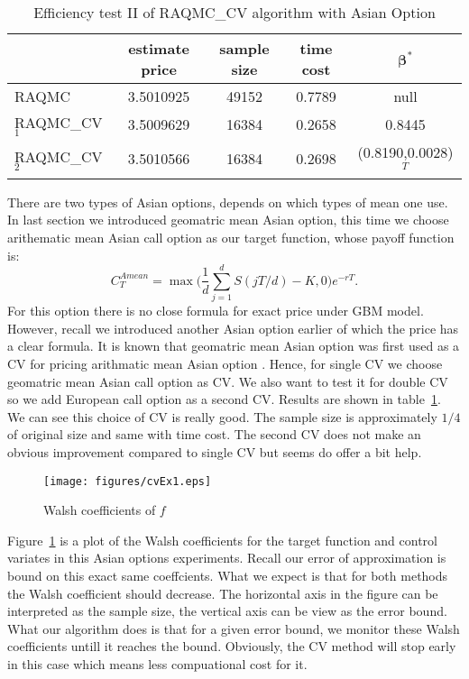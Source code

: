 \begin{table}[h]
    \centering
	\caption{Efficiency test II of RAQMC\_CV algorithm with Asian Option}
    \label{tb:efftest2a}
    \begin{tabular}{lcccc}  
    \hline\hline
    &estimate price&sample size&time cost&$\boldsymbol{\beta}^*$\\[0.5ex]
    \hline
    RAQMC& 3.5010925& 49152 & 0.7789 & null\\[1ex]
    RAQMC\_CV$_1$&3.5009629& 16384 & 0.2658& 0.8445 \\[1ex]
    RAQMC\_CV$_2$&3.5010566& 16384 & 0.2698&(0.8190,0.0028)$^T$\\[1ex]
    \hline
	\end{tabular}
\end{table}
There are two types of Asian options, depends on which types of mean one use. 
In last section we introduced geomatric mean Asian option, this time we choose arithematic mean Asian call option as our target function, whose payoff function is:
\[ C_{T}^{Amean} = \max\Big(\frac{1}{d}\sum_{j=1}^{d}S(jT/d)-K, 0\Big)e^{-rT}.\]
For this option there is no close formula for exact price under GBM model.
However, recall we introduced another Asian option earlier of which the price has a clear formula. 
It is known that geomatric mean Asian option was first used as a CV for pricing arithmatic mean Asian option \cite{kemna1990pricing}. 
Hence, for single CV we choose geomatric mean Asian call option as CV. 
We also want to test it for double CV so we add European call option as a second CV. 
Results are shown in table~\ref{tb:efftest2a}. We can see this choice of CV is really good. 
The sample size is approximately $1/4$ of original size and same with time cost. 
The second CV does not make an obvious improvement compared to single CV but seems do offer a bit help.    

\begin{figure}[h]
    \centering
    \setlength{\unitlength}{0.14in}     %
    \texttt{[image: figures/cvEx1.eps]}
    \caption{Walsh coefficients of $f$}
    \label{fg:cvEX1}
\end{figure}

Figure~\ref{fg:cvEX1} is a plot of the Walsh coefficients for the target function and control variates in this Asian options experiments. Recall our error of approximation is bound on this exact same coeffcients. 
What we expect is that for both methods the Walsh coefficient should decrease.   
The horizontal axis in the figure can be interpreted as the sample size, the vertical axis can be view as the error bound. 
What our algorithm does is that for a given error bound, we monitor these Walsh coefficients untill it reaches the bound. Obviously, the CV method will stop early in this case which means less compuational cost for it. 

